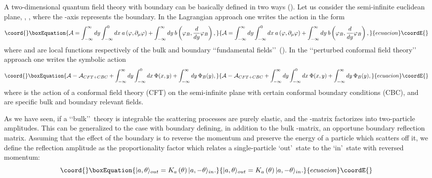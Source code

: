 \documentclass[a4paper,12pt]{report}
\begin{document}
A two-dimensional quantum field theory with boundary can be basically defined in two ways (\cite{ghoszam}). Let us
consider the semi-infinite euclidean plane, \myHighlight{$x\in (-\infty,0]$}\coordHE{}, \coordHE{}, where the \coordHE{}-axis
represents the boundary. In the Lagrangian approach one writes the action in the form
\begin{equation}\coord{}\boxEquation{\label{lagr}
{\cal A}=\int_{-\infty}^{\infty}dy\int_{-\infty}^{0}dx\:
a\left(\varphi,\partial_{\mu}\varphi\right)+\int_{-\infty}^{\infty}dy
\:b\left(\varphi_{B},\frac{d}{dy}\varphi_{B}\right),
}{{\cal A}=\int_{-\infty}^{\infty}dy\int_{-\infty}^{0}dx\:
a\left(\varphi,\partial_{\mu}\varphi\right)+\int_{-\infty}^{\infty}dy
\:b\left(\varphi_{B},\frac{d}{dy}\varphi_{B}\right),
}{ecuacion}\coordE{}\end{equation}
where \coordHE{} and \coordHE{} are local functions respectively of the bulk and boundary \lq\lq fundamental fields\rq\rq \,
\coordHE{} (\coordHE{}). In the \lq\lq perturbed conformal field theory\rq\rq
\, approach one writes the symbolic action
\begin{equation}\coord{}\boxEquation{\label{pert}
{\cal A}={\cal A}_{CFT+CBC}+\int_{-\infty}^{\infty}dy\int_{-\infty}^{0}dx\: \Phi(x,y)+\int_{-\infty}^{\infty}dy
\:\Phi_{B}(y),
}{{\cal A}={\cal A}_{CFT+CBC}+\int_{-\infty}^{\infty}dy\int_{-\infty}^{0}dx\: \Phi(x,y)+\int_{-\infty}^{\infty}dy
\:\Phi_{B}(y),
}{ecuacion}\coordE{}\end{equation}
where \coordHE{} is the action of a conformal field theory (CFT) on the semi-infinite plane with certain
conformal boundary conditions (CBC), and \coordHE{} are specific bulk and boundary relevant fields.


As we have seen, if a \lq\lq bulk\rq\rq \, theory is integrable the scattering processes are purely elastic, and
the \coordHE{}-matrix factorizes into two-particle amplitudes. This can be generalized to the case with boundary
defining, in addition to the bulk \coordHE{}-matrix, an opportune boundary reflection matrix. Assuming that the effect
of the boundary is to reverse the momentum and preserve the energy of a particle which scatters off it, we define
the reflection amplitude \coordHE{} as the proportionality factor which relates a single-particle \lq out\rq \,
state to the \lq in\rq \, state with reversed momentum:
\begin{equation}\coord{}\boxEquation{
|a,\theta\rangle_{out}=K_{a}\left(\theta\right)|a,-\theta\rangle_{in}.
}{
|a,\theta\rangle_{out}=K_{a}\left(\theta\right)|a,-\theta\rangle_{in}.
}{ecuacion}\coordE{}\end{equation}
\end{document}

